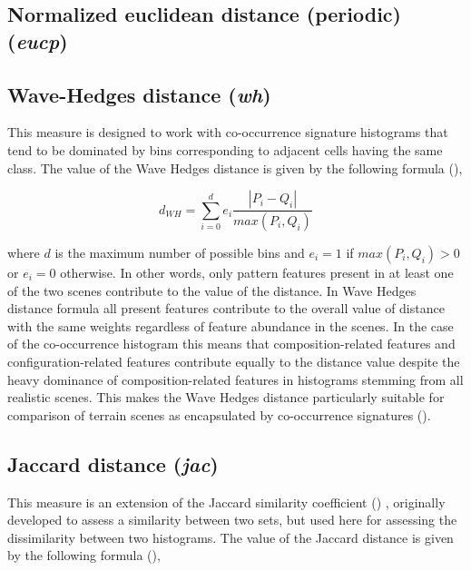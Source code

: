 \subsection{Normalized euclidean distance (periodic) ({\it eucp})}

\subsection{Wave-Hedges distance ({\it wh})}

This measure is designed to work with co-occurrence signature histograms that tend to be dominated by bins corresponding to adjacent cells having the same class. 
The value of the Wave Hedges distance is given by the following formula (\cite{Cha2007}),

\begingroup
\begin{equation} \label{eq:wave_hedges}
d_{WH}=\sum\limits_{i=0}^{d}{
 e_i\dfrac{ |P_{i} - Q_{i}|}{max(P_{i},Q_{i})}}
\end{equation}
\endgroup

\noindent where $d$ is the maximum number of possible bins and $e_i = 1$ if $max(P_{i},Q_{i})>0$ or $e_i = 0$ otherwise.
In other words, only pattern features present in at least one of the two scenes contribute to the value of the distance. 
In Wave Hedges distance formula all present features contribute to the overall value of distance with the same weights regardless of feature abundance in the scenes. 
In the case of the co-occurrence histogram this means that composition-related features and configuration-related features contribute equally to the distance value despite the heavy dominance of composition-related features in histograms stemming from all realistic scenes. 
This makes the Wave Hedges distance particularly suitable for comparison of terrain scenes as encapsulated by co-occurrence signatures (\cite{Jasiewicz2014GMRH}).



\subsection{Jaccard distance ({\it jac})}

This measure is an extension of the Jaccard similarity coefficient (\cite{Jaccard1908})
, originally developed to assess a similarity between two sets, but used here for assessing the dissimilarity between two histograms. 
The value of the Jaccard distance is given by the following formula (\cite{Cha2007}),

